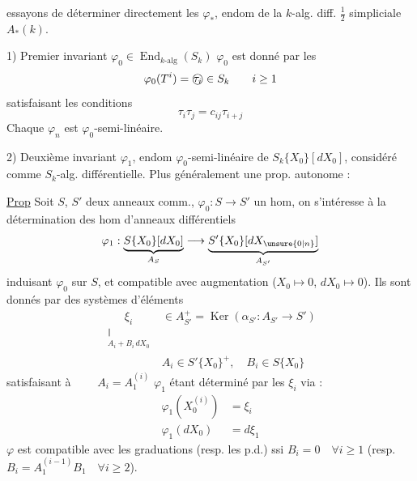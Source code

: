 essayons de déterminer directement les $\varphi_\ast$, endom de la $k$-alg. diff. $\frac12$ simpliciale $A_\ast(k)$.

1) Premier invariant $\varphi_0\in\operatorname{End}_{k\text{-alg}}(S_k)$
\margin{$\begin{gathered}\checkmark\\ -\\ \cdot\\ -\\ \cdot\end{gathered}$}
 $\varphi_0$ est donné par les
\[
\varphi_0(T^i)=\text{\textcircled{$\tau_i$}}\in S_k\qquad i\geq1
\]
satisfaisant les conditions
\[
\boxed{\tau_i\tau_j=c_{ij}\tau_{i+j}}
\]
Chaque $\varphi_n$ est $\varphi_0$-semi-linéaire.

2) Deuxième invariant $\varphi_1$, endom $\varphi_0$-semi-linéaire de $S_k\{X_0\}[dX_0]$, considéré comme $S_k$-alg. différentielle. 
Plus généralement une prop. autonome :

\uline{Prop} Soit $S$, $S'$ deux anneaux comm., $\varphi_0:S\longrightarrow S'$ un hom, on s'intéresse à la détermination des hom d'anneaux différentiels
\[
\varphi_1:\underbrace{S\{X_0\}[dX_0]}_{A_S}\longrightarrow\underbrace{S'\{X_0\}[dX_{\unsure{0|n}}]}_{A_{S'}}
\]
induisant $\varphi_0$ sur $S$, et compatible avec augmentation ($X_0\longmapsto0$, $dX_0\longmapsto0$). Ils sont donnés  par des systèmes d'éléments
\[
\begin{aligned}
\underset{\substack{\Vert\\A_i+B_i\,dX_0}}{\xi_i}&\in A_{S'}^+=\operatorname{Ker}(\alpha_{S'}:A_{S'}\longrightarrow S')\\
&A_i\in S'\{X_0\}^+,\quad B_i\in S\{X_0\}
\end{aligned}
\]
satisfaisant à $\qquad A_i=A_1^{(i)}$
$\varphi_1$ étant déterminé par les $\xi_i$ via :
\[
\begin{aligned}
\varphi_1(X_0^{(i)})&=\xi_i\\
\varphi_1(dX_0)&=d\xi_1
\end{aligned}
\]
$\varphi$ est compatible avec les graduations (resp. les p.d.) ssi $B_i=0\quad\forall i\geq1$ (resp. $B_i=A_1^{(i-1)}B_1\quad\forall i\geq2$).
